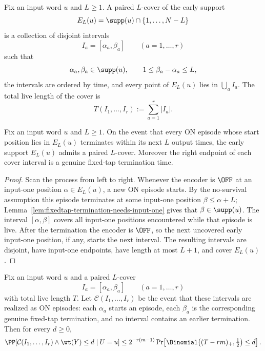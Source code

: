 \begin{definition}
\label{def:fixedtap-paired-cover}
Fix an input word \(u\) and \(L\ge 1\). A paired \(L\)-cover of the early support
\[
E_L(u)=\supp(u)\cap\{1,\dots,N-L\}
\]
is a collection of disjoint intervals
\[
I_a=[\alpha_a,\beta_a]\qquad (a=1,\dots,r)
\]
such that
\[
\alpha_a,\beta_a\in\supp(u),\qquad
1\le \beta_a-\alpha_a\le L,
\]
the intervals are ordered by time, and every point of \(E_L(u)\) lies in \(\bigcup_a I_a\).
The total live length of the cover is
\[
T(I_1,\dots,I_r):=\sum_{a=1}^r |I_a|.
\]
\end{definition}

\begin{lemma}
\label{lem:fixedtap-no-survival-paired-cover}
Fix an input word \(u\) and \(L\ge 1\). On the event that every ON episode whose start position lies in \(E_L(u)\)
terminates within its next \(L\) output times, the early support \(E_L(u)\) admits a paired \(L\)-cover. Moreover the
right endpoint of each cover interval is a genuine fixed-tap termination time.
\end{lemma}

\begin{proof}
Scan the process from left to right. Whenever the encoder is \(\OFF\) at an input-one position
\(\alpha\in E_L(u)\), a new ON episode starts. By the no-survival assumption this episode terminates at some input-one
position \(\beta\le \alpha+L\); Lemma~\ref{lem:fixedtap-termination-needs-input-one} gives that \(\beta\in\supp(u)\).
The interval \([\alpha,\beta]\) covers all input-one positions encountered while that episode is live. After the
termination the encoder is \(\OFF\), so the next uncovered early input-one position, if any, starts the next interval.
The resulting intervals are disjoint, have input-one endpoints, have length at most \(L+1\), and cover \(E_L(u)\).
\end{proof}

\begin{lemma}
\label{lem:fixedtap-paired-cover-charge}
Fix an input word \(u\) and a paired \(L\)-cover
\[
I_a=[\alpha_a,\beta_a]\qquad (a=1,\dots,r)
\]
with total live length \(T\). Let \(\mathcal{C}(I_1,\dots,I_r)\) be the event that these intervals are realized as ON
episodes: each \(\alpha_a\) starts an episode, each \(\beta_a\) is the corresponding genuine fixed-tap termination,
and no interval contains an earlier termination. Then for every \(d\ge 0\),
\[
\PP\!\left[
\mathcal{C}(I_1,\dots,I_r)
\wedge
\wt(Y)\le d
\mid U=u
\right]
\le
2^{-r(m-1)}
\Pr\!\left[\Binomial\!\left((T-rm)_+,\tfrac12\right)\le d\right].
\]
\end{lemma}

